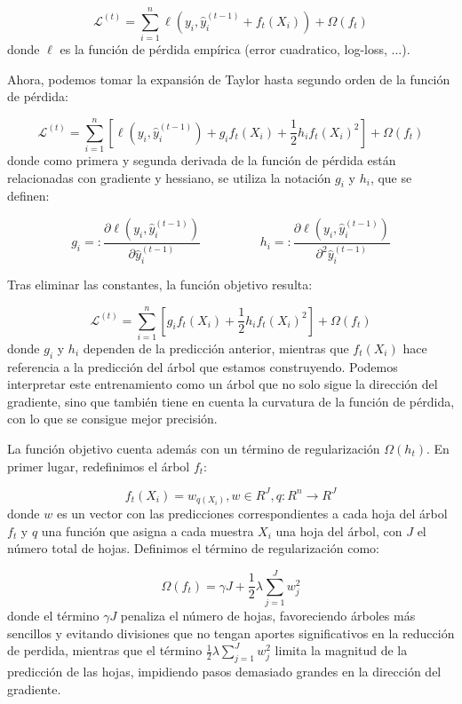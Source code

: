 \documentclass[titlepage, 11pt]{book}
\begin{document}
\begin{equation*}
    \mathcal{L}^{(t)}=\sum_{i=1}^n\ell(y_i,\hat{y}^{(t-1)}_i+f_t(X_i))+\Omega(f_t)
\end{equation*}
donde $\ell$ es la función de pérdida empírica (error cuadratico, log-loss, ...).

Ahora, podemos tomar la expansión de Taylor hasta segundo orden de la función de pérdida:

\begin{equation*}
    \mathcal{L}^{(t)}=\sum_{i=1}^n \left[ \ell(y_i,\hat{y}_i^{(t-1)})+g_if_t(X_i)+\frac{1}{2}h_i f_t(X_i)^2 \right] + \Omega(f_t)
\end{equation*}
donde como primera y segunda derivada de la función de pérdida están relacionadas con gradiente y hessiano, se utiliza la notación $g_i$ y $h_i$, que se definen:

\begin{equation*}
    g_i=:\frac{\partial \ell(y_i,\hat{y}_i^{(t-1)})}{\partial \hat{y}_i^{(t-1)}} \hspace{2cm} h_i=:\frac{\partial \ell(y_i,\hat{y}_i^{(t-1)})}{\partial^2 \hat{y}_i^{(t-1)}}
\end{equation*}

Tras eliminar las constantes, la función objetivo resulta:

\begin{equation*}
    \mathcal{L}^{(t)}=\sum_{i=1}^n \left[g_if_t(X_i)+\frac{1}{2}h_i f_t(X_i)^2 \right] + \Omega(f_t)
\end{equation*}
donde $g_i$ y $h_i$ dependen de la predicción anterior, mientras que $f_t(X_i)$ hace referencia a la predicción del árbol que estamos construyendo. Podemos interpretar este entrenamiento como un árbol que no solo sigue la dirección del gradiente, sino que también tiene en cuenta la curvatura de la función de pérdida, con lo que se consigue mejor precisión.

La función objetivo cuenta además con un término de regularización $\Omega(h_t)$. En primer lugar, redefinimos el árbol $f_t$:

\begin{equation*}
    f_t(X_i)=w_{q(X_i)}, w\in R^J, q:R^n\rightarrow R^J
\end{equation*}
donde $w$ es un vector con las predicciones correspondientes a cada hoja del árbol $f_t$ y $q$ una función que asigna a cada muestra $X_i$ una hoja del árbol, con $J$ el número total de hojas. Definimos el término de regularización como:

\begin{equation*}
    \Omega(f_t)=\gamma J + \frac{1}{2} \lambda \sum_{j=1}^J w_j^2
\end{equation*}
donde el término $\gamma J$ penaliza el número de hojas, favoreciendo árboles más sencillos y evitando divisiones que no tengan aportes significativos en la reducción de perdida, mientras que el término $\frac{1}{2} \lambda \sum_{j=1}^J w_j^2$ limita la magnitud de la predicción de las hojas, impidiendo pasos demasiado grandes en la dirección del gradiente.
\end{document}

